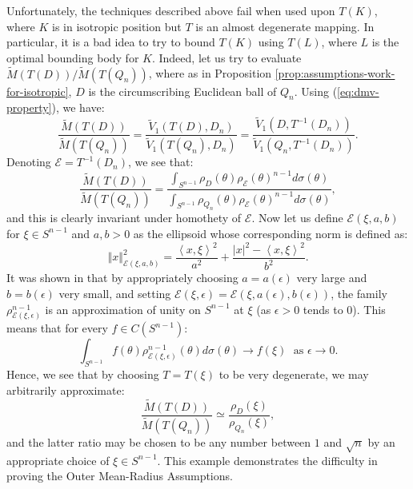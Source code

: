 \documentclass[12pt,oneside]{amsart}
\theoremstyle{definition}
\theoremstyle{remark}
\theoremstyle{proof}
\numberwithin{equation}{section}
\newcommand{\norm}[1]{\left\Vert#1\right\Vert}
\newcommand{\abs}[1]{\left\vert#1\right\vert}
\newcommand{\scalar}[1]{\left \langle #1 \right \rangle}
\newcommand{\E}{\mathcal{E}}
\renewcommand{\MR}{\widetilde{M}} %
\begin{document}
Unfortunately, the techniques described above fail when used upon
$T(K)$, where $K$ is in isotropic position but $T$ is an almost
degenerate mapping. In particular, it is a bad idea to try to
bound $T(K)$ using $T(L)$, where $L$ is the optimal bounding body
for $K$. Indeed, let us try to evaluate $\MR(T(D))/\MR(T(Q_n))$,
where as in Proposition
\ref{prop:assumptions-work-for-isotropic}, $D$ is the
circumscribing Euclidean ball of $Q_n$. Using
(\ref{eq:dmv-property}), we have:
\[
\frac{\MR(T(D))}{\MR(T(Q_n))} =
\frac{\widetilde{V}_1(T(D),D_n)}{\widetilde{V}_1(T(Q_n),D_n)} =
\frac{\widetilde{V}_1(D,T^{-1}(D_n))}{\widetilde{V}_1(Q_n,T^{-1}(D_n))}.
\]
Denoting $\E = T^{-1}(D_n)$, we see that:
\[
\frac{\MR(T(D))}{\MR(T(Q_n))} = \frac{\int_{S^{n-1}}
\rho_D(\theta) \rho_\E(\theta)^{n-1}
d\sigma(\theta)}{\int_{S^{n-1}} \rho_{Q_n}(\theta)
\rho_\E(\theta)^{n-1} d\sigma(\theta)},
\]
and this is clearly invariant under homothety of $\E$. Now let us
define $\E(\xi,a,b)$ for $\xi \in S^{n-1}$ and $a,b > 0$ as the
ellipsoid whose corresponding norm is defined as:
\[
\norm{x}^2_{\E(\xi,a,b)} = \frac{\scalar{x,\xi}^2}{a^2} +
\frac{\abs{x}^2 - \scalar{x,\xi}^2}{b^2}.
\]
It was shown in \cite{Goodey-Weil} that by appropriately choosing
$a=a(\epsilon)$ very large and $b=b(\epsilon)$ very small, and
setting $\E(\xi,\epsilon) = \E(\xi,a(\epsilon),b(\epsilon))$, the
family $\rho^{n-1}_{\E(\xi,\epsilon)}$ is an approximation of
unity on $S^{n-1}$ at $\xi$ (as $\epsilon>0$ tends to 0). This
means that for every $f \in C(S^{n-1})$:
\[
\int_{S^{n-1}} f(\theta) \rho^{n-1}_{\E(\xi,\epsilon)}(\theta)
d\sigma(\theta) \longrightarrow f(\xi) \; \textrm{ as } \epsilon
\rightarrow 0.
\]
Hence, we see that by choosing $T = T(\xi)$ to be very degenerate,
we may arbitrarily approximate:
\[
\frac{\MR(T(D))}{\MR(T(Q_n))} \simeq
\frac{\rho_D(\xi)}{\rho_{Q_n}(\xi)},
\]
and the latter ratio may be chosen to be any number between $1$
and $\sqrt{n}$ by an appropriate choice of $\xi \in S^{n-1}$.
This example demonstrates the difficulty in proving the Outer
Mean-Radius Assumptions.




%
%

\end{document}
